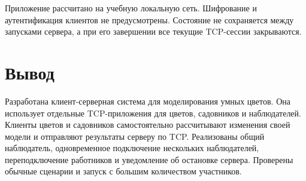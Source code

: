 \documentclass[12pt,a4paper]{article}
\begin{document}
Приложение рассчитано на учебную локальную сеть. Шифрование и аутентификация клиентов не предусмотрены. Состояние не сохраняется между запусками сервера, а при его завершении все текущие TCP-сессии закрываются.

\section{Вывод}
Разработана клиент-серверная система для моделирования умных цветов. Она использует отдельные TCP-приложения для цветов, садовников и наблюдателей. Клиенты цветов и садовников самостоятельно рассчитывают изменения своей модели и отправляют результаты серверу по TCP. Реализованы общий наблюдатель, одновременное подключение нескольких наблюдателей, переподключение работников и уведомление об остановке сервера. Проверены обычные сценарии и запуск с большим количеством участников.
\end{document}
